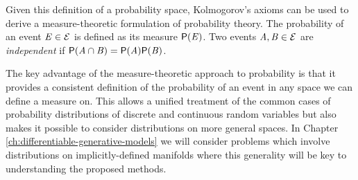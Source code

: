 Given this definition of a probability space, Kolmogorov's axioms \citep{kolmogorov1950foundations} can be used to derive a measure-theoretic formulation of probability theory. The probability of an event $\mathit{E} \in \mathcal{E}$ is defined as its measure $\mathsf{P}(\mathit{E})$. Two events $\mathit{A},\mathit{B} \in \mathcal{E}$ are \emph{independent} if $\mathsf{P}(\mathit{A}\cap\mathit{B}) = \mathsf{P}(\mathit{A})\mathsf{P}(\mathit{B})$.

The key advantage of the measure-theoretic approach to probability is that it provides a consistent definition of the probability of an event in any space we can define a measure on. This allows a unified treatment of the common cases of probability distributions of discrete and continuous random variables but also makes it possible to consider distributions on more general spaces. In Chapter \ref{ch:differentiable-generative-models} we will consider problems which involve distributions on implicitly-defined manifolds where this generality will be key to understanding the proposed methods.


